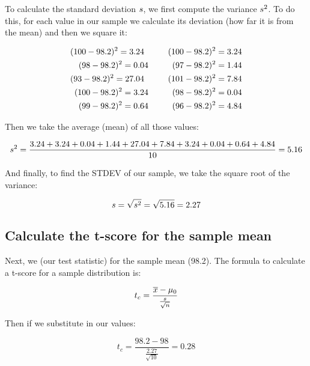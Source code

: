 \documentclass[../../../main.tex]{subfiles}
\begin{document}
\noindent
To calculate the standard deviation $s$, we first compute the variance $s^{2}$. To do this, for each value in our sample we calculate its deviation (how far it is from the mean) and then we square it:

\begin{align*}
  (100 - 98.2)^{2} = 3.24 \hskip 1cm (100 - 98.2)^{2} = 3.24 \\
  (98 - 98.2)^{2} = 0.04 \hskip 1cm (97 - 98.2)^{2} = 1.44 \\
  (93 - 98.2)^{2} = 27.04 \hskip 1cm (101 - 98.2)^{2} = 7.84 \\
  (100 - 98.2)^{2} = 3.24 \hskip 1cm (98 - 98.2)^{2} = 0.04 \\
  (99 - 98.2)^{2} = 0.64 \hskip 1cm (96 - 98.2)^{2} =  4.84
\end{align*}

\noindent
Then we take the average (mean) of all those values:

\begin{equation*}
  s^{2} = \frac{3.24 + 3.24 + 0.04 + 1.44 + 27.04 + 7.84 + 3.24 + 0.04 + 0.64 + 4.84}{10} = 5.16
\end{equation*}

\noindent
And finally, to find the STDEV of our sample, we take the square root of the variance:

\begin{equation*}
  s = \sqrt{s^{2}} = \sqrt{5.16} = 2.27
\end{equation*}


\subsection{Calculate the t-score for the sample mean}

Next, we  (our test statistic) for the sample mean (98.2). The formula to calculate a t-score for a sample distribution is:

\begin{equation*}
  t_{c} = \frac{\samplemean{x} - \HypPopMean/}{\frac{\samplestdev}{\sqrt{\samplesize/}}}
\end{equation*}

\noindent
Then if we substitute in our values:

\begin{equation*}
  t_{c} = \frac{98.2 - 98}{\frac{2.27}{\sqrt{10}}} = 0.28
\end{equation*}
\end{document}
